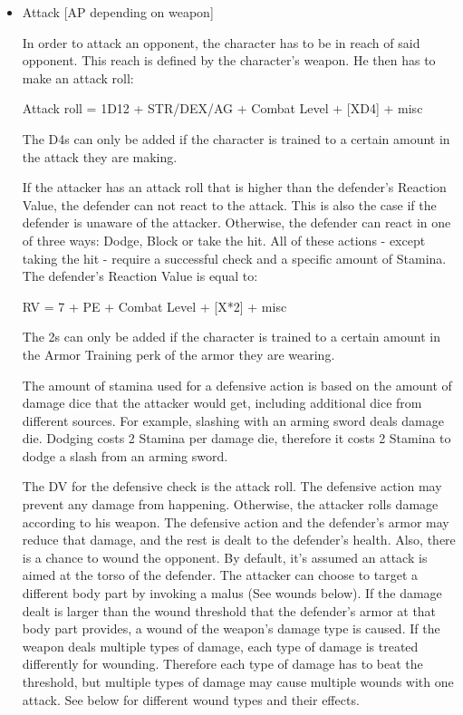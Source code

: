 \begin{itemize}

\item Attack [AP depending on weapon]

In order to attack an opponent, the character has to be in reach of said opponent. This reach is defined by the character’s weapon. He then has to make an attack roll:

Attack roll = 1D12 + STR/DEX/AG + Combat Level + [XD4] + misc

The D4s can only be added if the character is trained to a certain amount in the attack they are making.

If the attacker has an attack roll that is higher than the defender's Reaction Value, the defender can not react to the attack. This is also the case if the defender is unaware of the attacker. Otherwise, the defender can react in one of three ways: Dodge, Block or take the hit. All of these actions - except taking the hit - require a successful check and a specific amount of Stamina.
The defender's Reaction Value is equal to:

RV = 7 + PE + Combat Level + [X*2] + misc

The 2s can only be added if the character is trained to a certain amount in the Armor Training perk of the armor they are wearing.

The amount of stamina used for a defensive action is based on the amount of damage dice that the attacker would get, including additional dice from different sources. For example, slashing with an arming sword deals damage die. Dodging costs 2 Stamina per damage die, therefore it costs 2 Stamina to dodge a slash from an arming sword.

The DV for the defensive check is the attack roll. The defensive action may prevent any damage from happening. Otherwise, the attacker rolls damage according to his weapon. The defensive action and the defender's armor may reduce that damage, and the rest is dealt to the defender’s health. Also, there is a chance to wound the opponent. By default, it's assumed an attack is aimed at the torso of the defender. The attacker can choose to target a different body part by invoking a malus (See wounds below). If the damage dealt is larger than the wound threshold that the defender's armor at that body part provides, a wound of the weapon's damage type is caused. If the weapon deals multiple types of damage, each type of damage is treated differently for wounding. Therefore each type of damage has to beat the threshold, but multiple types of damage may cause multiple wounds with one attack. See below for different wound types and their effects. 



\end{itemize}
